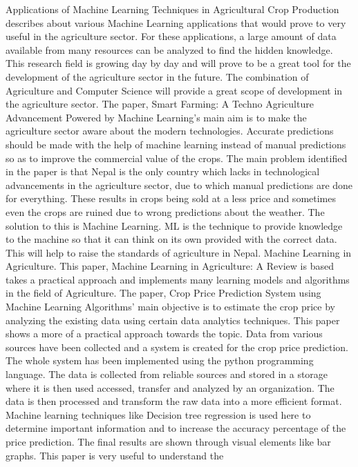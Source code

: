 Applications of Machine Learning Techniques in Agricultural Crop Production describes 
about various Machine Learning applications that would prove to very useful in the 
agriculture sector. For these applications, a large amount of data available from many 
resources can be analyzed to find the hidden knowledge. This research field is growing 
day by day and will prove to be a great tool for the development of the agriculture sector 
in the future. The combination of Agriculture and Computer Science will provide a great 
scope of development in the agriculture sector. The paper, Smart Farming: A Techno Agriculture 
Advancement Powered by Machine Learning’s main aim is to make the agriculture sector aware about 
the modern technologies. Accurate predictions should be made with the help of machine learning 
instead of manual predictions so as to improve the commercial value of the crops. The main problem 
identified in the paper is that Nepal is the only country which lacks in technological advancements 
in the agriculture sector, due to which manual predictions are done for everything. These results 
in crops being sold at a less price and sometimes even the crops are ruined due to wrong predictions 
about the weather. The solution to this is Machine Learning. ML is the technique to provide knowledge 
to the machine so that it can think on its own provided with the correct data. This will help to 
raise the standards of agriculture in Nepal. Machine Learning in Agriculture. This paper, Machine 
Learning in Agriculture: A Review is based takes a practical approach and implements many learning 
models and algorithms in the field of Agriculture.  
The paper, Crop Price Prediction System using Machine Learning Algorithms’ main objective is to estimate the 
crop price by analyzing the existing data using certain data analytics techniques. This 
paper shows a more of a practical approach towards the topic. Data from various sources 
have been collected and a system is created for the crop price prediction. The whole 
system has been implemented using the python programming language. The data is collected 
from reliable sources and stored in a storage where it is then used accessed, transfer 
and analyzed by an organization. The data is then processed and transform the raw data 
into a more efficient format. Machine learning techniques like Decision tree regression 
is used here to determine important information and to increase the 
accuracy percentage of the price prediction. The final results are shown through visual 
elements like bar graphs. This paper is very useful to understand the 
